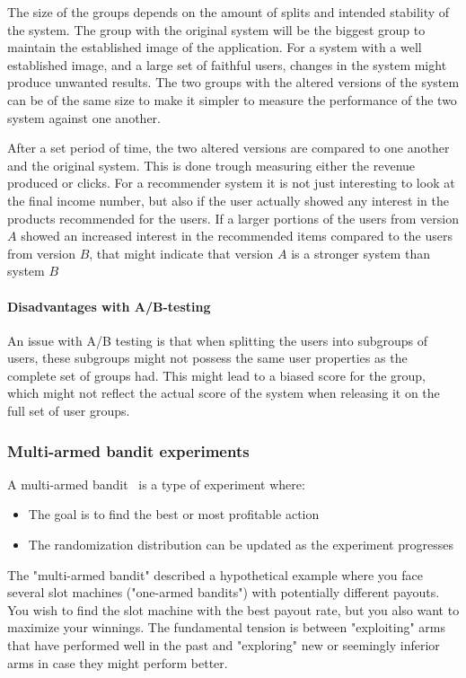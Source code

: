 The size of the groups depends on the amount of splits and intended stability
of the system.  The group with the original system will be the biggest group to
maintain the established image of the application.  For a system with a well
established image, and a large set of faithful users, changes in the system
might produce unwanted results.  The two groups with the altered versions of
the system can be of the same size to make it simpler to measure the
performance of the two system against one another.

After a set period of time, the two altered versions are compared to one
another and the original system.  This is done trough measuring either the
revenue produced or clicks.  For a recommender system it is not just
interesting to look at the final income number, but also if the user actually
showed any interest in the products recommended for the users.  If a larger
portions of the users from version $A$ showed an increased interest in the
recommended items compared to the users from version $B$, that might indicate
that version $A$ is a stronger system than system $B$

\paragraph{Disadvantages with A/B-testing}

An issue with A/B testing is that when splitting the users into subgroups of
users, these subgroups might not possess the same user properties as the
complete set of groups had.  This might lead to a biased score for the group,
which might not reflect the actual score of the system when releasing it on the
full set of user groups.

\subsubsection{Multi-armed bandit experiments}

A multi-armed bandit~\cite{googlebandit} is a type of experiment where:

\begin{itemize}
	\item The goal is to find the best or most profitable action
	\item The randomization distribution can be updated as the experiment progresses
\end{itemize}

The "multi-armed bandit" described a hypothetical example where you face
several slot machines ("one-armed bandits") with potentially different payouts.
You wish to find the slot machine with the best payout rate, but you also want
to maximize your winnings. The fundamental tension is between "exploiting" arms
that have performed well in the past and "exploring" new or seemingly inferior
arms in case they might perform better.

